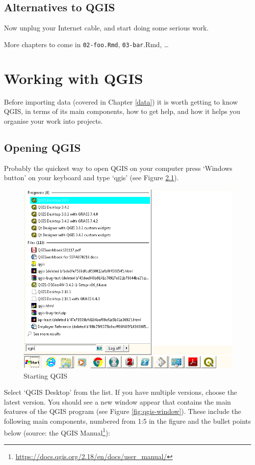 \documentclass[10pt,a5paper,]{book}
\renewcommand{\href}[2]{#2\footnote{\url{#1}}}
\begin{document}
\hypertarget{alternatives-to-qgis}{%
\section{Alternatives to QGIS}\label{alternatives-to-qgis}}

Now unplug your Internet cable, and start doing some serious work.

More chapters to come in \texttt{02-foo.Rmd}, \texttt{03-bar}.Rmd, \ldots{}

\hypertarget{working-with-qgis}{%
\chapter{Working with QGIS}\label{working-with-qgis}}

Before importing data (covered in Chapter \ref{data}) it is worth getting to know QGIS, in terms of its main components, how to get help, and how it helps you organise your work into projects.

\hypertarget{opening-qgis}{%
\section{Opening QGIS}\label{opening-qgis}}

Probably the quickest way to open QGIS on your computer press `Windows button' on your keyboard and type `qgis' (see Figure \ref{fig:qgis-start}).

\begin{figure}
\includegraphics[width=0.5\linewidth]{figures/qgis-start} \caption{Starting QGIS}\label{fig:qgis-start}
\end{figure}

Select `QGIS Desktop' from the list.
If you have multiple versions, choose the latest version.
You should see a new window appear that contains the main features of the QGIS program (see Figure \ref{fig:qgis-window}).
These include the following main components, numbered from 1:5 in the figure and the bullet points below (source: the \href{https://docs.qgis.org/2.18/en/docs/user_manual/}{QGIS Manual}):
\end{document}

